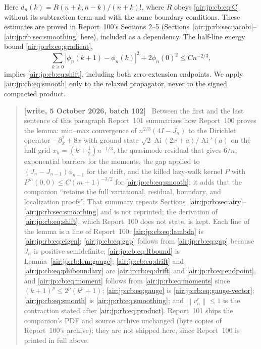 \documentclass[11pt,letterpaper]{article}
\numberwithin{equation}{section}
\theoremstyle{remark}
\newcommand{\Ai}{\operatorname{Ai}}
\newcommand{\norm}[1]{\left\lVert#1\right\rVert}
\newenvironment{writenotejp}{\par\smallskip\begin{quote}\small\textbf{[write, 5 October 2026, batch 102]}\ }{\end{quote}\smallskip}
\begin{document}
Here $d_n(k)=R(n+k,n-k)/(n+k)!$, where $R$ obeys \eqref{air:jp:cb:eq:C} without its subtraction term and with the same boundary conditions. These estimates are proved in Report~100's Sections 2--5 (Sections~\ref{air:jp:rb:sec:jacobi}--\ref{air:jp:rb:sec:smoothing} here), included as a dependency. The half-line energy bound \eqref{air:jp:rb:eq:gradient},
\[
 \sum_{k\ge0}|\phi_n(k+1)-\phi_n(k)|^2+2\phi_n(0)^2\le Cn^{-2/3},
\]
implies \eqref{air:jp:cb:eq:shift}, including both zero-extension endpoints. We apply \eqref{air:jp:cb:eq:smooth} only to the relaxed propagator, never to the signed compacted product.
\begin{writenotejp}
Between the first and the last sentence of this paragraph Report~101 summarizes how Report~100 proves the lemma: min--max convergence of $n^{2/3}(4I-J_n)$ to the Dirichlet operator $-\partial_x^2+8x$ with ground state $\sqrt2\Ai(2x+a)/\Ai'(a)$ on the half grid $x_k=(k+\frac12)n^{-1/3}$, the quasimode residual that gives $6/n$, exponential barriers for the moments, the gap applied to $(J_n-J_{n-1})\phi_{n-1}$ for the drift, and the killed lazy-walk kernel $P$ with $P^m(0,0)\le C(m+1)^{-3/2}$ for \eqref{air:jp:cb:eq:smooth}; it adds that the companion ``retains the full variational, residual, boundary, and localization proofs''. That summary repeats Sections~\ref{air:jp:rb:sec:airy}--\ref{air:jp:rb:sec:smoothing} and is not reprinted; the derivation of \eqref{air:jp:cb:eq:shift}, which Report~100 does not state, is kept. Each line of the lemma is a line of Report~100: \eqref{air:jp:cb:eq:lambda} is \eqref{air:jp:rb:eq:eigen}; \eqref{air:jp:cb:eq:gap} follows from \eqref{air:jp:rb:eq:gap} because $J_n$ is positive semidefinite; \eqref{air:jp:cb:eq:Rbound} is Lemma~\ref{air:jp:rb:lem:gauge}; \eqref{air:jp:cb:eq:drift} and \eqref{air:jp:cb:eq:phiboundary} are \eqref{air:jp:rb:eq:drift} and \eqref{air:jp:rb:eq:endpoint}, and \eqref{air:jp:cb:eq:moment} follows from \eqref{air:jp:rb:eq:moments} since $(k+1)^p\le2^p(k^p+1)$; \eqref{air:jp:cb:eq:gauge} is \eqref{air:jp:rb:eq:gauge-vector}; \eqref{air:jp:cb:eq:smooth} is \eqref{air:jp:rb:eq:smoothing}; and $\norm{v_n^r}\le1$ is the contraction stated after \eqref{air:jp:rb:eq:product}. Report~101 ships the companion's PDF and source archive unchanged (byte copies of Report~100's archive); they are not shipped here, since Report~100 is printed in full above.
\end{writenotejp}
\end{document}
